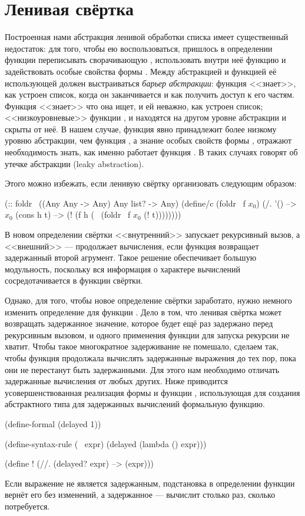 \section[2]{Ленивая свёртка}%
Построенная нами абстракция ленивой обработки списка имеет существенный недостаток:
для того, чтобы ею воспользоваться, пришлось в определении функции  переписывать сворачивающую , использовать внутри неё функцию \s{!} и задействовать особые свойства формы . Между абстракцией и функцией её использующей должен выстраиваться \emph{барьер абстракции}: функция  <<знает>>, как устроен список, когда он заканчивается и как получить доступ к его частям. Функция  <<знает>> что она ищет, и ей неважно, как устроен список; <<низкоуровневые>> функции ,  и  находятся на другом уровне абстракции и скрыты от неё. В нашем случае, функция \s{!} явно принадлежит более низкому уровню абстракции, чем функция , а знание особых свойств формы , отражают необходимость знать, как именно работает функция . В таких случаях говорят об утечке абстракции (leaky abstraction).

Этого можно избежать, если ленивую свёртку организовать следующим образом:

\label{lazy-fold}
\begin{Definition}[emph={f,lst,h,t}]
(:: foldr~ ((Any Any -> Any) Any list? -> Any)
  (define/c (foldr~ f $x_0$)
    (/. '() --> $x_0$
        (cons h t) --> (! (f h (~ (foldr~ f $x_0$ (! t))))))))
\end{Definition}

\noindent
В новом определении свёртки <<внутренний>> \s{!} запускает рекурсивный вызов, а <<внешний>> --- продолжает вычисления, если функция  возвращает задержанный второй агрумент. Такое решение обеспечивает большую модульность, поскольку вся информация о характере вычислений сосредотачивается в функции свёртки.

Однако, для того, чтобы новое определение свёртки заработато, нужно немного изменить определение для функции \s{!}. Дело в том, что ленивая свёртка может возвращать задержанное значение, которое будет ещё раз задержано перед рекурсивным вызовом, и одного применения функции \s{!} для запуска рекурсии не хватит. Чтобы такое многократное задерживание не помешало, сделаем так, чтобы функция \s{!} продолжала вычислять задержанные выражения до тех пор, пока они не перестанут быть задержанными. Для этого нам необходимо отличать задержанные вычисления от любых других. Ниже приводится усовершенствованная реализация формы \s{~} и функции \s{!}, использующая для создания  
абстрактного типа для задержанных вычислений формальную функцию.
\begin{Definition}
(define-formal (delayed 1))

(define-syntax-rule (~ expr)
  (delayed (lambda () expr)))

(define !
  (//. (delayed? expr) --> (expr)))
\end{Definition}
\noindent
Если выражение не является задержанным, подстановка в определении функции \s{!} вернёт его без изменений, а задержанное --- вычислит столько раз, сколько потребуется.

